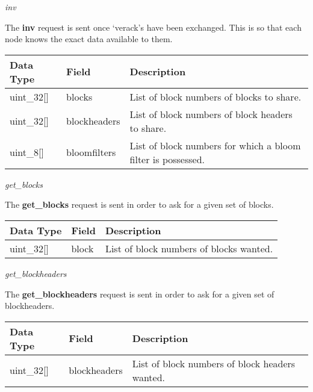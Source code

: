 \documentclass{article}
\begin{document}
\begin{center}
    \large \textit{inv}
\end{center}
The \textbf{inv} request is sent once `verack's have been exchanged. This is so that each node knows the exact data available to them.
\begin{table}[H]
\centering
\begin{tabular}{|p{1.5cm}|p{2.5cm}|p{5.5cm}|}
\hline
\rowcolor{tblgrey}
Data Type   & Field       & Description\\ \hline
uint\_32[\hspace{0.05cm}] & blocks & List of block numbers of blocks to share.                    \\ \hline
uint\_32[\hspace{0.05cm}] & blockheaders & List of block numbers of block headers to share.                    \\ \hline
uint\_8[\hspace{0.05cm}]  & bloomfilters & List of block numbers for which a bloom filter is possessed.        \\ \hline
\end{tabular}
\end{table}

\begin{center}
    \large \textit{get\_blocks}
\end{center}
The \textbf{get\_blocks} request is sent in order to ask for a given set of blocks.
\begin{table}[H]
\centering
\begin{tabular}{|p{1.5cm}|p{2.5cm}|p{5.5cm}|}
\hline
\rowcolor{tblgrey}
Data Type   & Field       & Description\\ \hline
uint\_32[\hspace{0.05cm}] & block & List of block numbers of blocks wanted.                    \\ \hline
\end{tabular}
\end{table}

\begin{center}
    \large \textit{get\_blockheaders}
\end{center}
The \textbf{get\_blockheaders} request is sent in order to ask for a given set of blockheaders.
\begin{table}[H]
\centering
\begin{tabular}{|p{1.5cm}|p{2.5cm}|p{5.5cm}|}
\hline
\rowcolor{tblgrey}
Data Type   & Field       & Description\\ \hline
uint\_32[\hspace{0.05cm}] & blockheaders & List of block numbers of block headers wanted.                    \\ \hline
\end{tabular}
\end{table}
\end{document}
